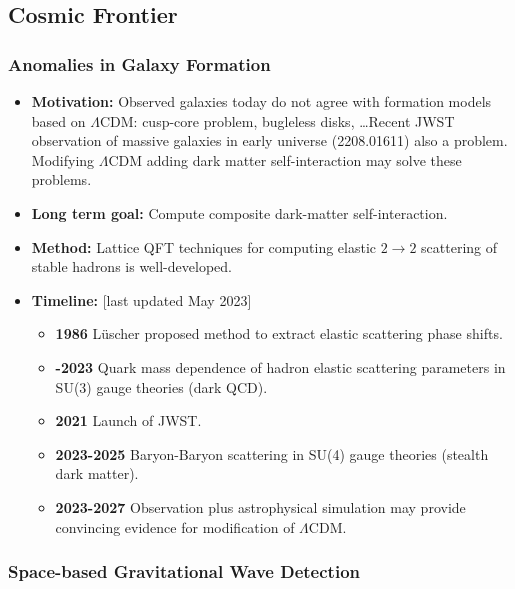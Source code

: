 \documentclass[12pt,hyperpdf]{article}
\begin{document}
\subsection{Cosmic Frontier}

\subsubsection{Anomalies in Galaxy Formation}

\begin{itemize}
   \item{ \bf Motivation:} Observed galaxies today do not agree with formation models based on $\Lambda$CDM: cusp-core problem, bugleless disks, \dots Recent JWST observation of massive galaxies in early universe (2208.01611) also a problem.  Modifying $\Lambda$CDM adding dark matter self-interaction may solve these problems.
   \item {\bf Long term goal:} Compute composite dark-matter self-interaction.
   \item{ \bf Method:} Lattice QFT techniques for computing elastic $2 \to 2$ scattering of stable hadrons is well-developed.
\item{\bf Timeline:} \hfill [last updated May 2023]
\begin{itemize}
   \item {\bf 1986} L\"uscher proposed method to extract elastic scattering phase shifts.
    \item {\bf -2023} Quark mass dependence of hadron elastic scattering parameters in SU(3) gauge theories (dark QCD).
   \item{\bf 2021} Launch of JWST. 
   \item {\bf 2023-2025} Baryon-Baryon scattering in SU(4) gauge theories (stealth dark matter).
   \item {\bf 2023-2027} Observation plus astrophysical simulation may provide convincing evidence for modification of $\Lambda$CDM.
\end{itemize}
\end{itemize}

\subsubsection{Space-based Gravitational Wave Detection}
\end{document}
